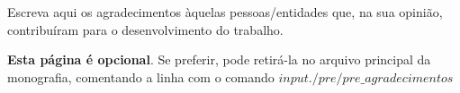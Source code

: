 \begin{agradecimentos}
Escreva aqui os agradecimentos àquelas pessoas/entidades que, na sua opinião, contribuíram para o desenvolvimento do trabalho.

\textbf{Esta página é opcional}. Se preferir, pode retirá-la no arquivo principal da monografia, comentando a linha com o comando $input{./pre/pre\_agradecimentos}$
\end{agradecimentos}


